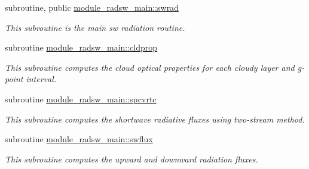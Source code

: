 {\bf }\par
\begin{DoxyCompactItemize}
\item 
subroutine, public \hyperlink{group__module__radsw__main_ga1186b2e2f7ebd5fb6dfbb43222d3ab3c}{module\+\_\+radsw\+\_\+main\+::swrad}
\begin{DoxyCompactList}\small\item\em This subroutine is the main sw radiation routine. \end{DoxyCompactList}\end{DoxyCompactItemize}

{\bf }\par
\begin{DoxyCompactItemize}
\item 
subroutine \hyperlink{group__module__radsw__main_ga1a3bb4385e7a610aa7eec9759383ffe9}{module\+\_\+radsw\+\_\+main\+::cldprop}
\begin{DoxyCompactList}\small\item\em This subroutine computes the cloud optical properties for each cloudy layer and g-\/point interval. \end{DoxyCompactList}\end{DoxyCompactItemize}

{\bf }\par
\begin{DoxyCompactItemize}
\item 
subroutine \hyperlink{group__module__radsw__main_gaed15bfde1b9f2286c58f6c807f8bf479}{module\+\_\+radsw\+\_\+main\+::spcvrtc}
\begin{DoxyCompactList}\small\item\em This subroutine computes the shortwave radiative fluxes using two-\/stream method. \end{DoxyCompactList}\end{DoxyCompactItemize}

{\bf }\par
\begin{DoxyCompactItemize}
\item 
subroutine \hyperlink{group__module__radsw__main_ga53ae1cb0229a048545027667adcc3cd7}{module\+\_\+radsw\+\_\+main\+::swflux}
\begin{DoxyCompactList}\small\item\em This subroutine computes the upward and downward radiation fluxes. \end{DoxyCompactList}\end{DoxyCompactItemize}


